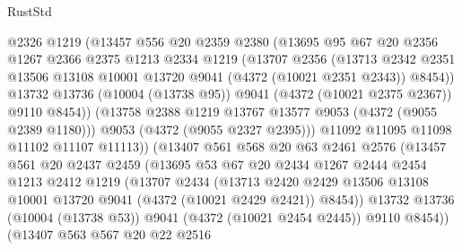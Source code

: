 \begin{lexlean}{RustStd}
\begin{coremodule}
                  @2326
                  @1219
                  (@13457
                    @556
                    @20
                    @2359
                    @2380
                    (@13695
                      @95
                      @67
                      @20
                      @2356
                      @1267
                      @2366
                      @2375
                      @1213
                      @2334
                      @1219
                      (@13707
                        @2356
                        (@13713
                          @2342
                          @2351
                          @13506
                          @13108
                          @10001
                          @13720
                          @9041
                          (@4372 (@10021 @2351 @2343))
                          @8454))
                      @13732
                      @13736
                      (@10004 (@13738 @95))
                      @9041
                      (@4372 (@10021 @2375 @2367))
                      @9110
                      @8454))
                  (@13758 @2388 @1219 @13767 @13577 @9053 (@4372 (@9055 @2389 @1180)))
                  @9053
                  (@4372 (@9055 @2327 @2395)))
                @11092
                @11095
                @11098
                @11102
                @11107
                @11113))
            (@13407
              @561
              @568
              @20
              @63
              @2461
              @2576
              (@13457
                @561
                @20
                @2437
                @2459
                (@13695
                  @53
                  @67
                  @20
                  @2434
                  @1267
                  @2444
                  @2454
                  @1213
                  @2412
                  @1219
                  (@13707
                    @2434
                    (@13713
                      @2420
                      @2429
                      @13506
                      @13108
                      @10001
                      @13720
                      @9041
                      (@4372 (@10021 @2429 @2421))
                      @8454))
                  @13732
                  @13736
                  (@10004 (@13738 @53))
                  @9041
                  (@4372 (@10021 @2454 @2445))
                  @9110
                  @8454))
              (@13407
                @563
                @567
                @20
                @22
                @2516

\end{coremodule}
\end{lexlean}

